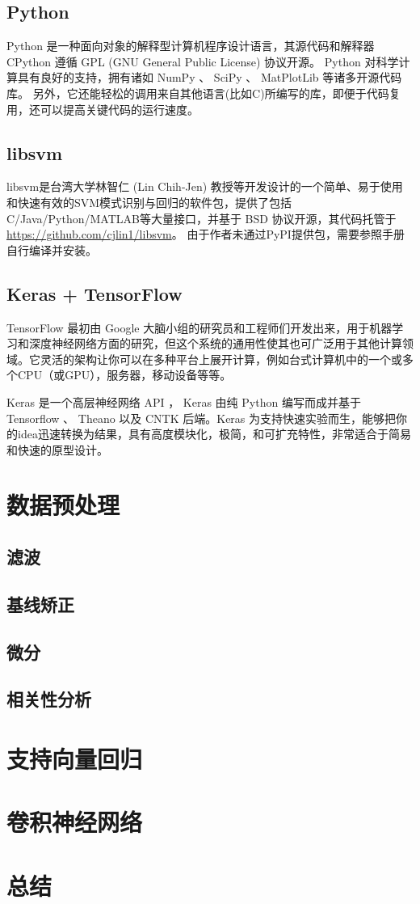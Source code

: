 \documentclass[a4paper]{article}
\begin{document}
		\subsection{Python}
			Python 是一种面向对象的解释型计算机程序设计语言，其源代码和解释器 CPython 遵循 GPL (GNU General Public License) 协议开源。
			Python 对科学计算具有良好的支持，拥有诸如 NumPy 、 SciPy 、 MatPlotLib 等诸多开源代码库。
			另外，它还能轻松的调用来自其他语言(比如C)所编写的库，即便于代码复用，还可以提高关键代码的运行速度。
		\subsection{libsvm}
			libsvm是台湾大学林智仁 (Lin Chih-Jen) 教授等开发设计的一个简单、易于使用和快速有效的SVM模式识别与回归的软件包，提供了包括C/Java/Python/MATLAB等大量接口，并基于 BSD 协议开源，其代码托管于\url{https://github.com/cjlin1/libsvm}。
			由于作者未通过PyPI提供包，需要参照手册自行编译并安装。
		\subsection{Keras + TensorFlow}
			TensorFlow 最初由 Google 大脑小组的研究员和工程师们开发出来，用于机器学习和深度神经网络方面的研究，但这个系统的通用性使其也可广泛用于其他计算领域。它灵活的架构让你可以在多种平台上展开计算，例如台式计算机中的一个或多个CPU（或GPU），服务器，移动设备等等。
			
			Keras 是一个高层神经网络 API ， Keras 由纯 Python 编写而成并基于 Tensorflow 、 Theano 以及 CNTK 后端。Keras 为支持快速实验而生，能够把你的idea迅速转换为结果，具有高度模块化，极简，和可扩充特性，非常适合于简易和快速的原型设计。
	\section{数据预处理}
		\subsection{滤波}
		\subsection{基线矫正}
		\subsection{微分}
		\subsection{相关性分析}
	\section{支持向量回归}
	\section{卷积神经网络}
	\section{总结}
\end{document}

